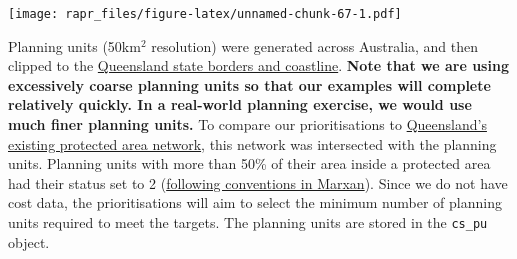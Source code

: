 \documentclass[11pt,]{article}
\newenvironment{Shaded}{\begin{snugshade}}{\end{snugshade}}
\newcommand{\KeywordTok}[1]{\textcolor[rgb]{0.13,0.29,0.53}{\textbf{{#1}}}}
\newcommand{\DataTypeTok}[1]{\textcolor[rgb]{0.13,0.29,0.53}{{#1}}}
\newcommand{\DecValTok}[1]{\textcolor[rgb]{0.00,0.00,0.81}{{#1}}}
\newcommand{\FloatTok}[1]{\textcolor[rgb]{0.00,0.00,0.81}{{#1}}}
\newcommand{\StringTok}[1]{\textcolor[rgb]{0.31,0.60,0.02}{{#1}}}
\newcommand{\CommentTok}[1]{\textcolor[rgb]{0.56,0.35,0.01}{\textit{{#1}}}}
\newcommand{\OtherTok}[1]{\textcolor[rgb]{0.56,0.35,0.01}{{#1}}}
\newcommand{\NormalTok}[1]{{#1}}
\let\origfigure\figure
\let\endorigfigure\endfigure
\renewenvironment{figure}[1][2] {
	\expandafter\origfigure\expandafter[H]
} {
	\endorigfigure
}
\begin{document}
\begin{figure}[htbp]
\centering
\texttt{[image: rapr\_files/figure-latex/unnamed-chunk-67-1.pdf]}
\caption{Distribution map for four Australian bird species. Pixel
colours denote probability of occupancy.}
\end{figure}

Planning units (50km$^2$ resolution) were generated across Australia,
and then clipped to the
\href{http://www.abs.gov.au/ausstats/abs@.nsf/mf/1259.0.30.001?OpenDocument}{Queensland
state borders and coastline}. \textbf{Note that we are using excessively
coarse planning units so that our examples will complete relatively
quickly. In a real-world planning exercise, we would use much finer
planning units.} To compare our prioritisations to
\href{http://www.protectedplanet.net/country/AU}{Queensland's existing
protected area network}, this network was intersected with the planning
units. Planning units with more than 50\% of their area inside a
protected area had their status set to 2
(\href{http://www.uq.edu.au/marxan/tutorial/module4.html}{following
conventions in Marxan}). Since we do not have cost data, the
prioritisations will aim to select the minimum number of planning units
required to meet the targets. The planning units are stored in the
\texttt{cs\_pu} object.

\begin{Shaded}
\end{Shaded}
\end{document}
